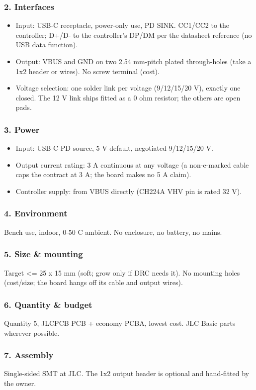 \documentclass[11pt,a4paper]{article}
\begin{document}
\subsubsection*{2. Interfaces}
\begin{itemize}
\item Input: USB-C receptacle, power-only use, PD SINK. CC1/CC2 to the controller; D+/D- to
the controller's DP/DM per the datasheet reference (no USB data function).
\item Output: VBUS and GND on two 2.54 mm-pitch plated through-holes (take a 1x2 header or
wires). No screw terminal (cost).
\item Voltage selection: one solder link per voltage (9/12/15/20 V), exactly one closed.
The 12 V link ships fitted as a 0 ohm resistor; the others are open pads.
\end{itemize}
\subsubsection*{3. Power}
\begin{itemize}
\item Input: USB-C PD source, 5 V default, negotiated 9/12/15/20 V.
\item Output current rating: 3 A continuous at any voltage (a non-e-marked cable caps the
contract at 3 A; the board makes no 5 A claim).
\item Controller supply: from VBUS directly (CH224A VHV pin is rated 32 V).
\end{itemize}
\subsubsection*{4. Environment}
Bench use, indoor, 0-50 C ambient. No enclosure, no battery, no mains.

\subsubsection*{5. Size \& mounting}
Target \textless{}= 25 x 15 mm (soft; grow only if DRC needs it). No mounting holes (cost/size; the board hangs off its cable and output wires).

\subsubsection*{6. Quantity \& budget}
Quantity 5, JLCPCB PCB + economy PCBA, lowest cost. JLC Basic parts wherever possible.

\subsubsection*{7. Assembly}
Single-sided SMT at JLC. The 1x2 output header is optional and hand-fitted by the owner.
\end{document}
